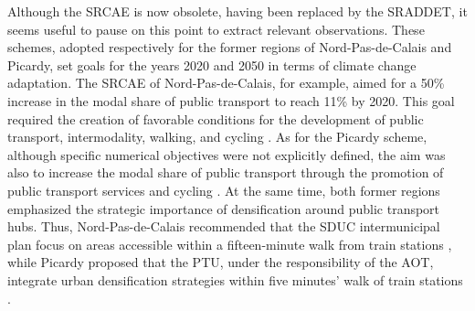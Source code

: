 \begin{refsegment}
Although the \acrfull{SRCAE} is now obsolete, having been replaced by the \acrshort{SRADDET}, it seems useful to pause on this point to extract relevant observations. These schemes, adopted respectively for the former regions of Nord-Pas-de-Calais and Picardy, set goals for the years 2020 and 2050 in terms of climate change adaptation. The \acrshort{SRCAE} of Nord-Pas-de-Calais, for example, aimed for a 50\% increase in the modal share of public transport to reach 11\% by 2020. This goal required the creation of favorable conditions for the development of public transport, intermodality, walking, and cycling \textcolor{blue}{\autocite[176, 178]{region_nord-pas-de-calais_schema_2012}}. As for the Picardy scheme, although specific numerical objectives were not explicitly defined, the aim was also to increase the modal share of public transport through the promotion of public transport services and cycling \textcolor{blue}{\autocite[35]{region_picardie_schema_2012}}. At the same time, both former regions emphasized the strategic importance of densification around public transport hubs. Thus, Nord-Pas-de-Calais recommended that the \acrfull{SDUC} intermunicipal plan focus on areas accessible within a fifteen-minute walk from train stations \textcolor{blue}{\autocite[144]{region_nord-pas-de-calais_schema_2012}}, while Picardy proposed that the \acrfull{PTU}, under the responsibility of the \acrshort{AOT}, integrate urban densification strategies within five minutes' walk of train stations \textcolor{blue}{\autocite[12]{region_picardie_schema_2012}}.%


\end{refsegment}
